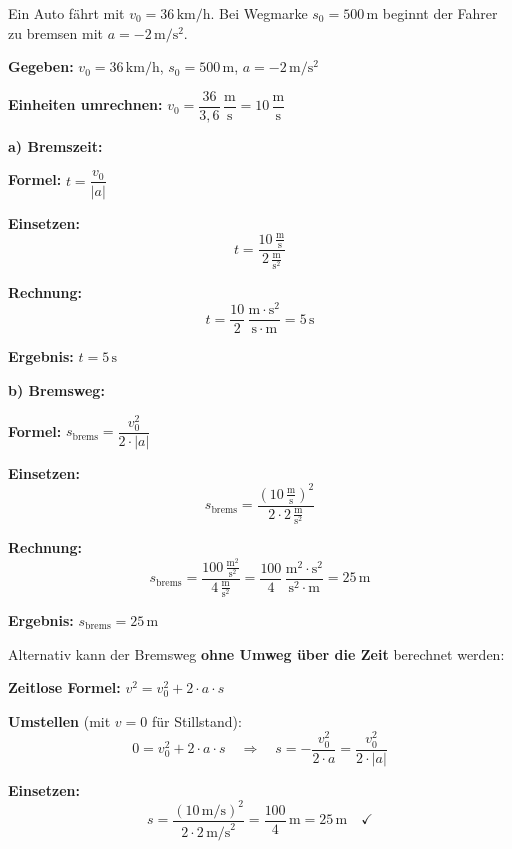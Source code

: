 \documentclass[11pt,a4paper]{article}
\begin{document}
\begin{beispiel}
Ein Auto fährt mit $v_0 = 36\,\mathrm{km/h}$. Bei Wegmarke $s_0 = 500\,\mathrm{m}$ beginnt der Fahrer zu bremsen mit $a = -2\,\mathrm{m/s^2}$.

\textbf{Gegeben:} $v_0 = 36\,\mathrm{km/h}$, \quad $s_0 = 500\,\mathrm{m}$, \quad $a = -2\,\mathrm{m/s^2}$

\textbf{Einheiten umrechnen:} $v_0 = \dfrac{36}{3{,}6}\,\dfrac{\mathrm{m}}{\mathrm{s}} = 10\,\dfrac{\mathrm{m}}{\mathrm{s}}$

\vspace{0.3cm}
\textbf{a) Bremszeit:}

\textbf{Formel:} $t = \dfrac{v_0}{|a|}$

\textbf{Einsetzen:}
\[
t = \frac{10\,\frac{\mathrm{m}}{\mathrm{s}}}{2\,\frac{\mathrm{m}}{\mathrm{s}^2}}
\]

\textbf{Rechnung:}
\[
t = \frac{10}{2}\,\frac{\mathrm{m} \cdot \mathrm{s}^2}{\mathrm{s} \cdot \mathrm{m}} = 5\,\mathrm{s}
\]

\textbf{Ergebnis:} $\boxed{t = 5\,\mathrm{s}}$

\vspace{0.3cm}
\textbf{b) Bremsweg:}

\textbf{Formel:} $s_{\text{brems}} = \dfrac{v_0^2}{2 \cdot |a|}$

\textbf{Einsetzen:}
\[
s_{\text{brems}} = \frac{\left(10\,\frac{\mathrm{m}}{\mathrm{s}}\right)^2}{2 \cdot 2\,\frac{\mathrm{m}}{\mathrm{s}^2}}
\]

\textbf{Rechnung:}
\[
s_{\text{brems}} = \frac{100\,\frac{\mathrm{m}^2}{\mathrm{s}^2}}{4\,\frac{\mathrm{m}}{\mathrm{s}^2}} = \frac{100}{4}\,\frac{\mathrm{m}^2 \cdot \mathrm{s}^2}{\mathrm{s}^2 \cdot \mathrm{m}} = 25\,\mathrm{m}
\]

\textbf{Ergebnis:} $\boxed{s_{\text{brems}} = 25\,\mathrm{m}}$

\vspace{0.5cm}
\begin{tcolorbox}[colback=physikblue!5, colframe=physikblue, boxrule=0.5pt, title=\textbf{Variante B: Mit zeitloser Formel}]
Alternativ kann der Bremsweg \textbf{ohne Umweg über die Zeit} berechnet werden:

\textbf{Zeitlose Formel:} $v^2 = v_0^2 + 2 \cdot a \cdot s$

\textbf{Umstellen} (mit $v = 0$ für Stillstand):
\[
0 = v_0^2 + 2 \cdot a \cdot s \quad \Rightarrow \quad s = -\frac{v_0^2}{2 \cdot a} = \frac{v_0^2}{2 \cdot |a|}
\]

\textbf{Einsetzen:}
\[
s = \frac{(10\,\mathrm{m/s})^2}{2 \cdot 2\,\mathrm{m/s}^2} = \frac{100}{4}\,\mathrm{m} = 25\,\mathrm{m} \quad \checkmark
\]


\end{tcolorbox}
\end{beispiel}
\end{document}
